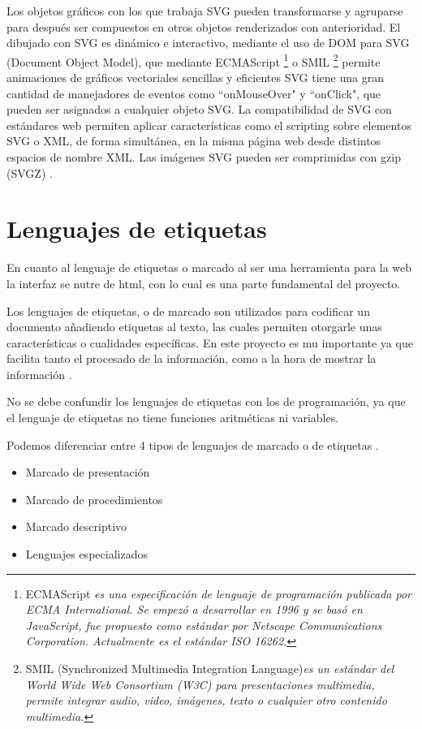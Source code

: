 Los objetos gráficos con los que trabaja SVG pueden transformarse y agruparse para después ser compuestos en otros objetos renderizados con anterioridad. 
El dibujado con SVG es dinámico e interactivo, mediante el uso de DOM para SVG (Document Object Model), que mediante ECMAScript \footnote{ECMAScript \textit{es una especificación de lenguaje de programación publicada por ECMA International. Se empezó a desarrollar en 1996 y se basó en JavaScript, fue propuesto como estándar por Netscape Communications Corporation. Actualmente es el estándar ISO 16262.}} o SMIL \footnote{SMIL (Synchronized Multimedia Integration Language)\textit{es un estándar del World Wide Web Consortium (W3C) para presentaciones multimedia, permite integrar audio, video, imágenes, texto o cualquier otro contenido multimedia.}} permite animaciones de gráficos vectoriales sencillas y eficientes
SVG tiene una gran cantidad de manejadores de eventos como ``onMouseOver" y ``onClick", que pueden ser asignados a cualquier objeto SVG. La compatibilidad de SVG con estándares web permiten aplicar características como el scripting sobre elementos SVG o XML, de forma simultánea, en la misma página web desde distintos espacios de nombre XML.
Las imágenes SVG pueden ser comprimidas con gzip (SVGZ) \cite{scalablevec}.


\section{Lenguajes de etiquetas}\label{lenguajes-etiuetas}

En cuanto al lenguaje de etiquetas o marcado al ser una herramienta para la web la interfaz se nutre de html, con lo cual es una parte fundamental del proyecto.

Los lenguajes de etiquetas, o de marcado son utilizados para codificar un documento añadiendo etiquetas al texto, las cuales permiten otorgarle unas características o cualidades específicas. En este proyecto es mu importante ya que facilita tanto el procesado de la información, como a la hora de mostrar la información \cite{lenguajemarc}.

No se debe confundir los lenguajes de etiquetas con los de programación, ya que el lenguaje de etiquetas no tiene funciones aritméticas ni variables.

Podemos diferenciar entre 4 tipos de lenguajes de marcado o de etiquetas \cite{lenguajemarcecu} \cite{lmarcas}.
\begin{itemize}
\item
Marcado de presentación
\item
Marcado de procedimientos
\item
Marcado descriptivo
\item
Lenguajes especializados

\end{itemize}

